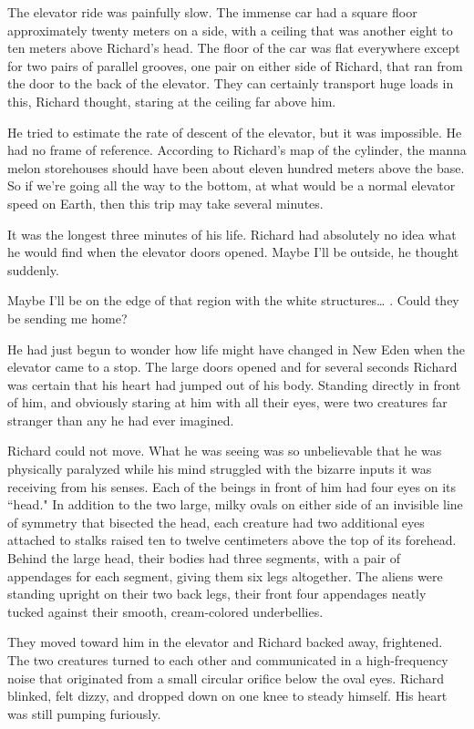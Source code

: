 \documentclass[]{article}
\begin{document}
{The elevator ride was painfully slow.  The immense car had a square floor approximately twenty meters on a side, with a ceiling that was another eight to ten meters above Richard’s head.  The floor of the car was flat everywhere except for two pairs of parallel grooves, one pair on either side of Richard, that ran from the door to the back of the elevator.  They can certainly transport huge loads in this, Richard thought, staring at the ceiling far above him.

He tried to estimate the rate of descent of the elevator, but it was impossible.  He had no frame of reference.  According to Richard’s map of the cylinder, the manna melon storehouses should have been about eleven hundred meters above the base.  So if we’re going all the way to the bottom, at what would be a normal elevator speed on Earth, then this trip may take several minutes.

It was the longest three minutes of his life.  Richard had absolutely no idea what he would find when the elevator doors opened.  Maybe I’ll be outside, he thought suddenly.

Maybe I’ll be on the edge of that region with the white structures… .  Could they be sending me home?

He had just begun to wonder how life might have changed in New Eden when the elevator came to a stop.  The large doors opened and for several seconds Richard was certain that his heart had jumped out of his body.  Standing directly in front of him, and obviously staring at him with all their eyes, were two creatures far stranger than any he had ever imagined.

Richard could not move.  What he was seeing was so unbelievable that he was physically paralyzed while his mind struggled with the bizarre inputs it was receiving from his senses.  Each of the beings in front of him had four eyes on its “head."  In addition to the two large, milky ovals on either side of an invisible line of symmetry that bisected the head, each creature had two additional eyes attached to stalks raised ten to twelve centimeters above the top of its forehead.  Behind the large head, their bodies had three segments, with a pair of appendages for each segment, giving them six legs altogether.  The aliens were standing upright on their two back legs, their front four appendages neatly tucked against their smooth, cream-colored underbellies.

They moved toward him in the elevator and Richard backed away, frightened.  The two creatures turned to each other and communicated in a high-frequency noise that originated from a small circular orifice below the oval eyes.  Richard blinked, felt dizzy, and dropped down on one knee to steady himself.  His heart was still pumping furiously.

}
\end{document}
